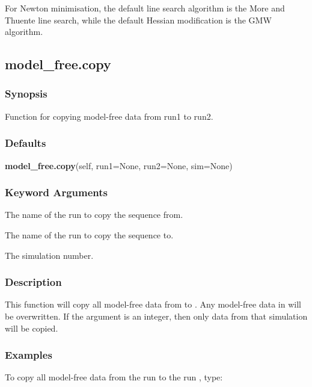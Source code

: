 For Newton minimisation, the default line search algorithm is the More and Thuente line search,
while the default Hessian modification is the GMW algorithm.


\newpage

\subsection{model\_free.copy}


\subsubsection{Synopsis}

Function for copying model-free data from run1 to run2.

\subsubsection{Defaults}

\textsf{\textbf{model\_free.copy}(self, run1=None, run2=None, sim=None)}


\subsubsection{Keyword Arguments}


  The name of the run to copy the sequence from.

  The name of the run to copy the sequence to.

  The simulation number.

\subsubsection{Description}

This function will copy all model-free data from 
 to 
.  Any model-free data in
 will be overwritten.  If the argument 
 is an integer, then only data from that
simulation will be copied.


\subsubsection{Examples}

To copy all model-free data from the run 
 to the run 
, type:


